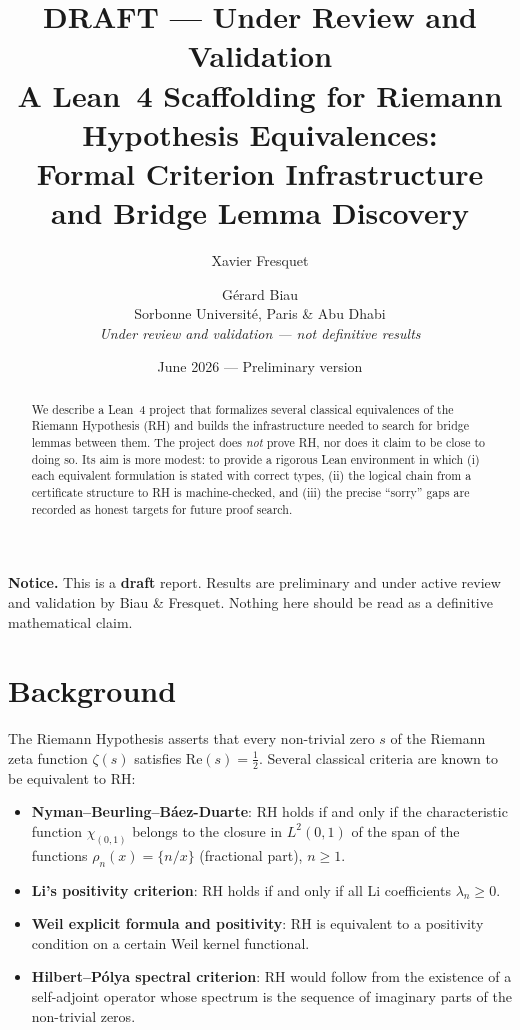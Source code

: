 \documentclass[11pt,a4paper]{article}
\title{\textbf{DRAFT --- Under Review and Validation}\\[0.4em]
A Lean~4 Scaffolding for Riemann Hypothesis Equivalences:\\
\large Formal Criterion Infrastructure and Bridge Lemma Discovery}
\author{Xavier Fresquet \and Gérard Biau\\[0.3em]
\normalsize Sorbonne Université, Paris \& Abu Dhabi\\
\normalsize \textit{Under review and validation --- not definitive results}}
\date{June 2026 --- Preliminary version}
\begin{document}
\maketitle

\begin{mdframed}[backgroundcolor=yellow!15, linecolor=orange!60, linewidth=1pt]
\textbf{Notice.} This is a \textbf{draft} report.  Results are preliminary
and under active review and validation by Biau \& Fresquet.  Nothing here
should be read as a definitive mathematical claim.
\end{mdframed}

\vspace{1em}

\begin{abstract}
We describe a Lean~4 project that formalizes several classical equivalences of
the Riemann Hypothesis (RH) and builds the infrastructure needed to search for
bridge lemmas between them.  The project does \emph{not} prove RH, nor does it
claim to be close to doing so.  Its aim is more modest: to provide a rigorous
Lean environment in which (i) each equivalent formulation is stated with correct
types, (ii) the logical chain from a certificate structure to RH is
machine-checked, and (iii) the precise ``sorry'' gaps are recorded as honest
targets for future proof search.
\end{abstract}

\section{Background}

The Riemann Hypothesis asserts that every non-trivial zero $s$ of the Riemann
zeta function $\zeta(s)$ satisfies $\mathrm{Re}(s) = \tfrac{1}{2}$.  Several
classical criteria are known to be equivalent to RH:

\begin{itemize}
  \item \textbf{Nyman--Beurling--Báez-Duarte}: RH holds if and only if the
        characteristic function $\chi_{(0,1)}$ belongs to the closure in
        $L^2(0,1)$ of the span of the functions
        $\rho_n(x) = \{n/x\}$ (fractional part), $n \geq 1$.
  \item \textbf{Li's positivity criterion}: RH holds if and only if all Li
        coefficients $\lambda_n \geq 0$.
  \item \textbf{Weil explicit formula and positivity}: RH is equivalent to a
        positivity condition on a certain Weil kernel functional.
  \item \textbf{Hilbert--Pólya spectral criterion}: RH would follow from the
        existence of a self-adjoint operator whose spectrum is the sequence of
        imaginary parts of the non-trivial zeros.
\end{itemize}
\end{document}
